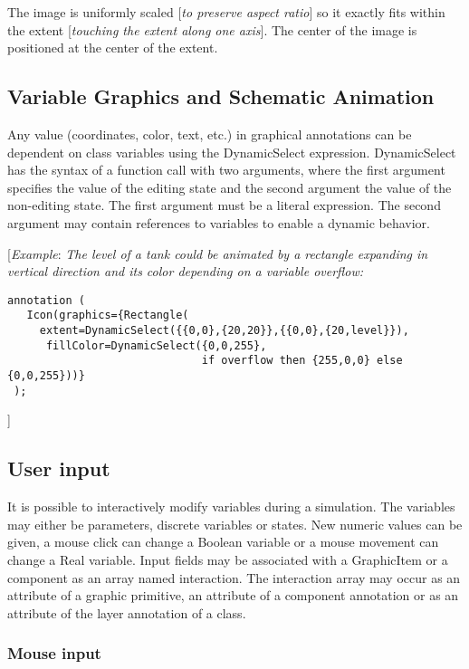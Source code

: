 The image is uniformly scaled {[}\emph{to preserve aspect ratio}{]} so
it exactly fits within the extent {[}\emph{touching the extent along one
axis}{]}. The center of the image is positioned at the center of the
extent.

\subsection{Variable Graphics and Schematic Animation}

Any value (coordinates, color, text, etc.) in graphical annotations can
be dependent on class variables using the DynamicSelect expression.
DynamicSelect has the syntax of a function call with two arguments,
where the first argument specifies the value of the editing state and
the second argument the value of the non-editing state. The first
argument must be a literal expression. The second argument may contain
references to variables to enable a dynamic behavior.

{[}\emph{Example}: \emph{The level of a tank could be animated by a
rectangle expanding in vertical direction and its color depending on a
variable overflow:}
\begin{lstlisting}[language=modelica]
  annotation (
   Icon(graphics={Rectangle(
     extent=DynamicSelect({{0,0},{20,20}},{{0,0},{20,level}}),
      fillColor=DynamicSelect({0,0,255},
                              if overflow then {255,0,0} else {0,0,255}))}
 );
\end{lstlisting}
{]}

\subsection{User input}

It is possible to interactively modify variables during a simulation.
The variables may either be parameters, discrete variables or states.
New numeric values can be given, a mouse click can change a Boolean
variable or a mouse movement can change a Real variable. Input fields
may be associated with a GraphicItem or a component as an array named
interaction. The interaction array may occur as an attribute of a
graphic primitive, an attribute of a component annotation or as an
attribute of the layer annotation of a class.

\subsubsection{Mouse input}

